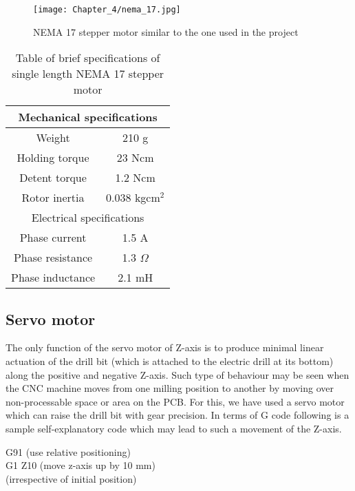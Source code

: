 \begin{figure}[h]
 \centering
 \texttt{[image: Chapter\_4/nema\_17.jpg]}
 \caption{NEMA 17 stepper motor similar to the one used in the project}
 \label{fig:stepper}
\end{figure}

\begin{table}[h]
 \def\arraystretch{1.5}
 \centering
 \caption{Table of brief specifications of single length NEMA 17 stepper motor}
 \begin{tabular}{|c|c|}
  \hline
  \multicolumn{2}{|c|}{Mechanical specifications} \\
  \hline
  Weight           & 210 g                        \\
  \hline
  Holding torque   & 23 Ncm                       \\
  \hline
  Detent torque    & 1.2 Ncm                      \\
  \hline
  Rotor inertia    & 0.038 kgcm$^{2}$             \\
  \hline
  \multicolumn{2}{|c|}{Electrical specifications} \\
  \hline
  Phase current    & 1.5 A                        \\
  \hline
  Phase resistance & 1.3 $\Omega$                 \\
  \hline
  Phase inductance & 2.1 mH                       \\
  \hline
 \end{tabular}
 \label{tab:step_specs}
\end{table}


\subsection{Servo motor}

The only function of the servo motor of Z-axis is to produce minimal linear actuation of the drill bit (which is attached to the electric drill at its bottom) along the positive and negative Z-axis. Such type of behaviour may be seen when the CNC machine moves from one milling position to another by moving over non-processable space or area on the PCB. For this, we have used a servo motor which can raise the drill bit with gear precision. In terms of G code following is a sample self-explanatory code which may lead to such a movement of the Z-axis.


\begin{flushleft}
 {\selectfont G91 (use relative positioning) \\
  G1 Z10 (move z-axis up by 10 mm) \\
  \hspace{18.2mm}(irrespective of initial position)
 }
\end{flushleft}

